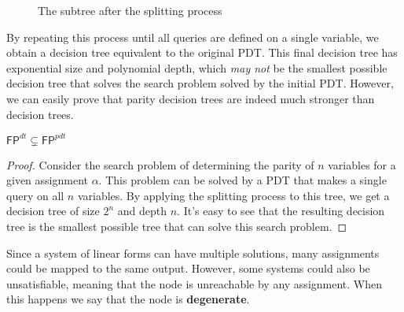\begin{figure}[H]

    \caption{The subtree after the splitting process}
\end{figure}

By repeating this process until all queries are defined on a single variable, we obtain a decision tree equivalent to the original PDT. This final decision tree has exponential size and polynomial depth, which \textit{may not} be the smallest possible decision tree that solves the search problem solved by the initial PDT. However, we can easily prove that parity decision trees are indeed much stronger than decision trees.

\begin{theorem}
    \label{fp_pdt_not_inside_fp_dt}
    $\mathsf{FP}^{dt} \subsetneq \mathsf{FP}^{pdt}$
\end{theorem}

\begin{proof}
 Consider the search problem of determining the parity of $n$ variables for a given assignment $\alpha$. This problem can be solved by a PDT that makes a single query on all $n$ variables. By applying the splitting process to this tree, we get a decision tree of size $2^n$ and depth $n$. It's easy to see that the resulting decision tree is the smallest possible tree that can solve this search problem.
\end{proof}

\newpage

Since a system of linear forms can have multiple solutions, many assignments could be mapped to the same output. However, some systems could also be unsatisfiable, meaning that the node is unreachable by any assignment. When this happens we say that the node is \textbf{degenerate}.

